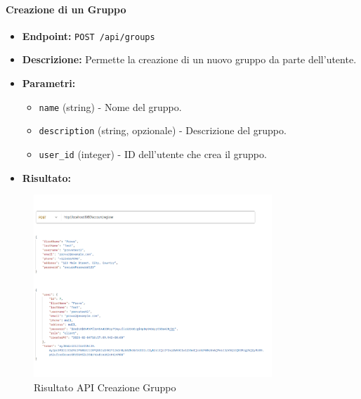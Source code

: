 \paragraph{Creazione di un Gruppo}
\begin{itemize}
    \item \textbf{Endpoint:} \texttt{POST /api/groups}
    \item \textbf{Descrizione:} Permette la creazione di un nuovo gruppo da parte dell'utente.
    \item \textbf{Parametri:}
    \begin{itemize}
        \item \texttt{name} (string) - Nome del gruppo.
        \item \texttt{description} (string, opzionale) - Descrizione del gruppo.
        \item \texttt{user\_id} (integer) - ID dell'utente che crea il gruppo.
    \end{itemize}
    \item \textbf{Risultato:}
\end{itemize}
\begin{figure}[H]
    \centering
    \includegraphics[width=0.8\textwidth]{images/registerapi.png}
    \caption{Risultato API Creazione Gruppo}
    \label{fig:api_create_group}
\end{figure}

